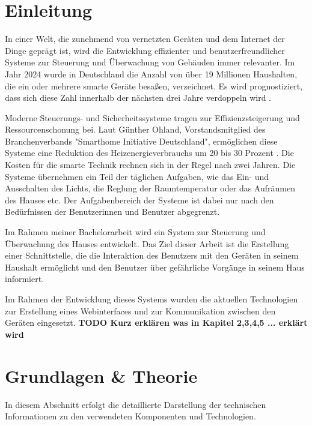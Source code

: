 \documentclass[12pt, letterpaper]{article}
\author{Oleksii Baida}
\date{Mai 2024}
\begin{document}


\tableofcontents
\pagebreak

\section{Einleitung}
\par In einer Welt, die zunehmend von vernetzten Geräten und dem Internet der Dinge geprägt ist, wird die Entwicklung effizienter und benutzerfreundlicher Systeme zur Steuerung und Überwachung von Gebäuden immer relevanter. Im Jahr 2024 wurde in Deutschland die Anzahl von über 19 Millionen Haushalten, die ein oder mehrere smarte Geräte besaßen, verzeichnet. Es wird prognostiziert, dass sich diese Zahl innerhalb der nächsten drei Jahre verdoppeln wird \cite{statita_smhomes}.
\par Moderne Steuerungs- und Sicherheitssysteme tragen zur Effizienzsteigerung und Ressourcenschonung bei. Laut Günther Ohland, Vorstandsmitglied des Branchenverbands "Smarthome Initiative Deutschland", ermöglichen diese Systeme eine Reduktion des Heizenergieverbrauchs um 20 bis 30 Prozent \cite{spiegel_heizung}. Die Kosten für die smarte Technik rechnen sich in der Regel nach zwei Jahren. Die Systeme übernehmen ein Teil der täglichen Aufgaben, wie das Ein- und Ausschalten des Lichts, die Reglung der Raumtemperatur oder das Aufräumen des Hauses etc. Der Aufgabenbereich der Systeme ist dabei nur nach den Bedürfnissen der Benutzerinnen und Benutzer abgegrenzt.
\par Im Rahmen meiner Bachelorarbeit wird ein System zur Steuerung und Überwachung des Hauses entwickelt. Das Ziel dieser Arbeit ist die Erstellung einer Schnittstelle, die die Interaktion des Benutzers mit den Geräten in seinem Haushalt ermöglicht und den Benutzer über gefährliche Vorgänge in seinem Haus informiert. 
\par Im Rahmen der Entwicklung dieses Systems wurden die aktuellen Technologien zur Erstellung eines Webinterfaces und zur Kommunikation zwischen den Geräten eingesetzt. \textbf{TODO Kurz erklären was in Kapitel 2,3,4,5 ... erklärt wird}

\newpage
\section{Grundlagen \& Theorie}
\par In diesem Abschnitt erfolgt die detaillierte Darstellung der technischen Informationen zu den verwendeten Komponenten und Technologien. 
\end{document}
